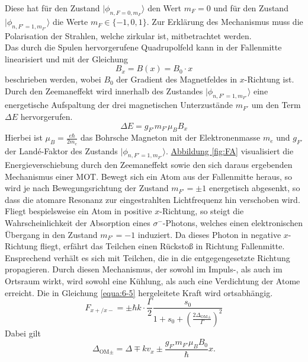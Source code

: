 \documentclass[
class=book,
accentcolor=1b,
custommargins=geometry,
fontsize=11pt,
thesis={type=Versuchsanleitung},
ruledheaders=all,
headline=false,
instbox=false,
marginpar=false,
title=small,
ignore-missing-data=true,
twoside=false,
logofile=apqdesign/tuda_logo.pdf,
pdfa=false %
]{apqpub}
\begin{document}
				Diese hat für den Zustand $\lvert \phi_{n,F=0,m_F}\rangle$ den Wert $m_F=0$ und für den Zustand $\lvert \phi_{n,F'=1,m_{F'}}\rangle$ die Werte $m_F \in \{-1,0,1\}$. 
				Zur Erklärung des Mechanismus muss die Polarisation der Strahlen, welche zirkular ist, mitbetrachtet werden.\\
				Das durch die Spulen hervorgerufene Quadrupolfeld kann in der Fallenmitte linearisiert und mit der Gleichung
				\begin{equation}
				B_x = B(x) = B_0 \cdot x
				\end{equation}			
				beschrieben werden, wobei $B_0$ der Gradient des Magnetfeldes in $x$-Richtung ist. 
				Durch den Zeemaneffekt wird innerhalb des Zustandes $\lvert \phi_{n,F'=1,m_{F'}}\rangle$ eine energetische Aufspaltung der drei magnetischen Unterzustände $m_{F'}$ um den Term $\Delta E$ hervorgerufen.		
				\begin{equation}
				\Delta E = g_{F'} m_{F'} \mu_B B_x
				\end{equation}				
				Hierbei ist $\mu_B = \frac{e \hbar}{2 m_e}$ das Bohrsche Magneton mit der Elektronenmasse $m_e$ und $g_{F'}$ der Landé-Faktor des Zustands $\lvert \phi_{n,F'=1,m_{F'}}\rangle$. 
				\hyperref[fig:FA]{Abbildung \ref{fig:FA}} visualisiert die Energieverschiebung durch den Zeemaneffekt sowie den sich daraus ergebenden Mechanismus einer MOT. 
				Bewegt sich ein Atom aus der Fallenmitte heraus, so wird je nach Bewegungsrichtung der Zustand $m_{F'} = \pm 1$ energetisch abgesenkt, so dass die atomare Resonanz zur eingestrahlten Lichtfrequenz hin verschoben wird. 
				Fliegt bespielsweise ein Atom in positive $x$-Richtung, so steigt die Wahrscheinlichkeit der Absorption eines $\sigma^-$-Photons, welches einen elektronischen Übergang in den Zustand $m_{F'} = -1$ induziert. 
				Da dieses Photon in negative $x$-Richtung fliegt, erfährt das Teilchen einen Rückstoß in Richtung	Fallenmitte. 
				Ensprechend verhält es sich mit Teilchen, die in die entgegengesetzte Richtung propagieren.
				Durch diesen Mechanismus, der sowohl im Impuls-, als auch im Ortsraum wirkt, wird sowohl eine Kühlung, als auch eine Verdichtung der Atome erreicht.
				Die in Gleichung \eqref{equa:6-5} hergeleitete Kraft wird ortsabhängig.			
				\begin{equation}\label{equa:6-11}
				F_{x+/ x-} = \pm \hbar k \cdot \frac{\Gamma}{2} \frac{s_0}{1+s_0+\left(\frac{2\Delta_{\text{OM}\pm}}{\Gamma}\right)^2} 
				\end{equation}				
				Dabei gilt		
				\begin{equation}
				\Delta_{\text{OM}\pm} = \Delta \mp k v_{x} \pm \frac{g_{F'} m_{F'} \mu_B B_0}{\hbar}x.
				\end{equation}				
\end{document}
